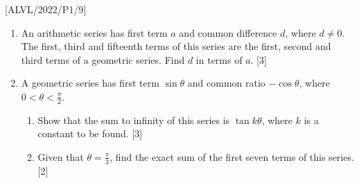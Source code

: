 \item {[}ALVL/2022/P1/9{]}
\begin{enumerate}
\item An arithmetic series has first term $a$ and common difference $d$,
where $d\ne0$. The first, third and fifteenth terms of this series
are the first, second and third terms of a geometric series. Find
$d$ in terms of $a$.\hfill{} {[}3{]}
\item A geometric series has first term $\sin\theta$ and common ratio $-\cos\theta$,
where $0<\theta<\frac{\pi}{2}$. 
\begin{enumerate}
\item Show that the sum to infinity of this series is $\tan k\theta$, where
$k$ is a constant to be found. \hfill{}{[}3{]}
\item Given that $\theta=\frac{\pi}{3}$, find the exact sum of the first
seven terms of this series. \hfill{}{[}2{]}
\end{enumerate}
\end{enumerate}
